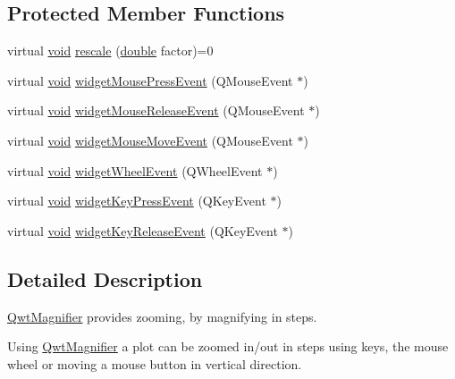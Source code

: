 \subsection*{Protected Member Functions}
\begin{DoxyCompactItemize}
\item 
virtual \hyperlink{group___u_a_v_objects_plugin_ga444cf2ff3f0ecbe028adce838d373f5c}{void} \hyperlink{class_qwt_magnifier_a5c3d5bda10412a50bd403afe84e2ccee}{rescale} (\hyperlink{_super_l_u_support_8h_a8956b2b9f49bf918deed98379d159ca7}{double} factor)=0
\item 
virtual \hyperlink{group___u_a_v_objects_plugin_ga444cf2ff3f0ecbe028adce838d373f5c}{void} \hyperlink{class_qwt_magnifier_a5930b3ec00ae99883f36cf8bf568cbf7}{widget\-Mouse\-Press\-Event} (Q\-Mouse\-Event $\ast$)
\item 
virtual \hyperlink{group___u_a_v_objects_plugin_ga444cf2ff3f0ecbe028adce838d373f5c}{void} \hyperlink{class_qwt_magnifier_aa7cc31995444ca8dd8412b8a6dab7b93}{widget\-Mouse\-Release\-Event} (Q\-Mouse\-Event $\ast$)
\item 
virtual \hyperlink{group___u_a_v_objects_plugin_ga444cf2ff3f0ecbe028adce838d373f5c}{void} \hyperlink{class_qwt_magnifier_a4eb68b98b063cc14b7839f02f8671dfc}{widget\-Mouse\-Move\-Event} (Q\-Mouse\-Event $\ast$)
\item 
virtual \hyperlink{group___u_a_v_objects_plugin_ga444cf2ff3f0ecbe028adce838d373f5c}{void} \hyperlink{class_qwt_magnifier_a236762870830cc0621411c173472392b}{widget\-Wheel\-Event} (Q\-Wheel\-Event $\ast$)
\item 
virtual \hyperlink{group___u_a_v_objects_plugin_ga444cf2ff3f0ecbe028adce838d373f5c}{void} \hyperlink{class_qwt_magnifier_a382cec084a2bfc0610ca500121205f04}{widget\-Key\-Press\-Event} (Q\-Key\-Event $\ast$)
\item 
virtual \hyperlink{group___u_a_v_objects_plugin_ga444cf2ff3f0ecbe028adce838d373f5c}{void} \hyperlink{class_qwt_magnifier_af84037c68c9b88263d1c27bb648cf9ff}{widget\-Key\-Release\-Event} (Q\-Key\-Event $\ast$)
\end{DoxyCompactItemize}


\subsection{Detailed Description}
\hyperlink{class_qwt_magnifier}{Qwt\-Magnifier} provides zooming, by magnifying in steps. 

Using \hyperlink{class_qwt_magnifier}{Qwt\-Magnifier} a plot can be zoomed in/out in steps using keys, the mouse wheel or moving a mouse button in vertical direction. 

